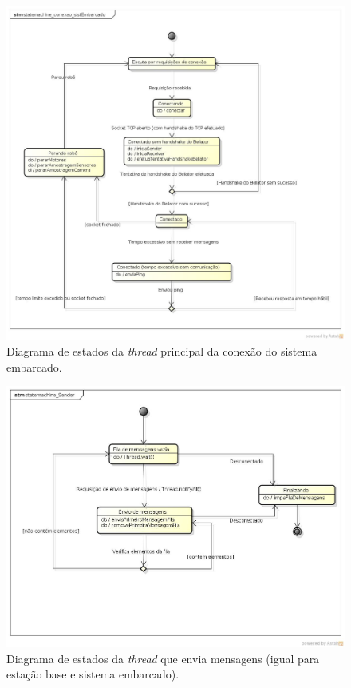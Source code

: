 \begin{figure}[H]
  \centering
  \includegraphics[width=\textwidth, keepaspectratio]{./figuras/sistEmbarcado/statemachine_conexao_sistEmbarcado.jpg}
  \caption{Diagrama de estados da \textit{thread} principal da conexão do sistema embarcado.}
  \label{fig:diagrama_estados_sist_embarcado}
\end{figure}

\begin{figure}[H]
  \centering
  \includegraphics[width=\textwidth, keepaspectratio]{./figuras/statemachine_Sender.jpg}
  \caption{Diagrama de estados da \textit{thread} que envia mensagens (igual para estação base e sistema embarcado).}
  \label{fig:diagrama_estados_sender}
\end{figure}

